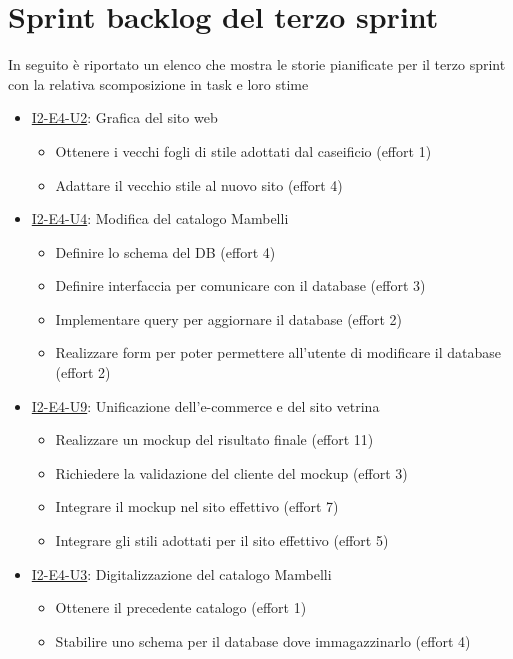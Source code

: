 \chapter{Sprint backlog del terzo sprint}
In seguito è riportato un elenco che mostra le storie pianificate per il terzo sprint con la relativa scomposizione in task e loro stime

\begin{itemize}
  \item \href{}{I2-E4-U2}: Grafica del sito web
        \begin{itemize}
          \item Ottenere i vecchi fogli di stile adottati dal caseificio (effort 1)
          \item Adattare il vecchio stile al nuovo sito (effort 4)
        \end{itemize}
  \item \href{}{I2-E4-U4}: Modifica del catalogo Mambelli
        \begin{itemize}
          \item Definire lo schema del DB (effort 4)
          \item Definire interfaccia per comunicare con il database (effort 3)
          \item Implementare query per aggiornare il database (effort 2)
          \item Realizzare form per poter permettere all'utente di modificare il database (effort 2)
        \end{itemize}
  \item \href{}{I2-E4-U9}: Unificazione dell'e-commerce e del sito vetrina
        \begin{itemize}
          \item Realizzare un mockup del risultato finale (effort 11)
          \item Richiedere la validazione del cliente del mockup (effort 3)
          \item Integrare il mockup nel sito effettivo (effort 7)
          \item Integrare gli stili adottati per il sito effettivo (effort 5)
        \end{itemize}
  \item \href{}{I2-E4-U3}: Digitalizzazione del catalogo Mambelli
        \begin{itemize}
          \item Ottenere il precedente catalogo (effort 1)
          \item Stabilire uno schema per il database dove immagazzinarlo (effort 4)

\end{itemize}
\end{itemize}
